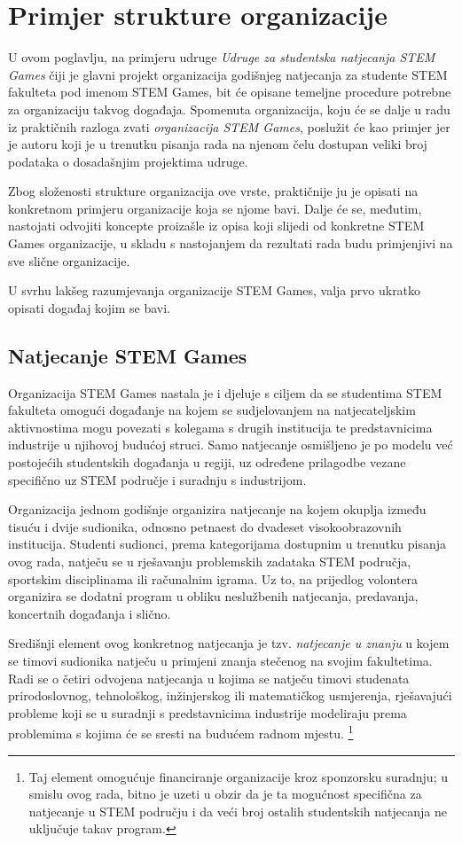\documentclass[times, utf8, diplomski]{fer}
\begin{document}
\chapter{Primjer strukture organizacije}

U ovom poglavlju, na primjeru udruge \emph{Udruge za studentska natjecanja STEM
Games} čiji je glavni projekt organizacija godišnjeg natjecanja za studente STEM
fakulteta pod imenom STEM Games, bit će opisane temeljne procedure potrebne za
organizaciju takvog događaja. Spomenuta organizacija, koju će se dalje u radu iz
praktičnih razloga zvati \emph{organizacija STEM Games}, poslužit će kao primjer
jer je autoru koji je u trenutku pisanja rada na njenom čelu dostupan veliki
broj podataka o dosadašnjim projektima udruge.

Zbog složenosti strukture organizacija ove vrste, praktičnije ju je opisati na
konkretnom primjeru organizacije koja se njome bavi. Dalje će se, međutim,
nastojati odvojiti koncepte proizašle iz opisa koji slijedi od konkretne STEM
Games organizacije, u skladu s nastojanjem da rezultati rada budu primjenjivi na
sve slične organizacije.

U svrhu lakšeg razumjevanja organizacije STEM Games, valja prvo ukratko opisati
događaj kojim se bavi.

\section{Natjecanje STEM Games}

Organizacija STEM Games nastala je i djeluje s ciljem da se studentima STEM
fakulteta omogući događanje na kojem se sudjelovanjem na natjecateljskim
aktivnostima mogu povezati s kolegama s drugih institucija te predstavnicima
industrije u njihovoj budućoj struci. Samo natjecanje osmišljeno je po modelu
već postojećih studentskih događanja u regiji, uz određene prilagodbe vezane
specifično uz STEM područje i suradnju s industrijom.

Organizacija jednom godišnje organizira natjecanje na kojem okuplja između
tisuću i dvije sudionika, odnosno petnaest do dvadeset visokoobrazovnih
institucija.  Studenti sudionci, prema kategorijama dostupnim u trenutku pisanja
ovog rada, natječu se u rješavanju problemskih zadataka STEM područja, sportskim
disciplinama ili računalnim igrama. Uz to, na prijedlog volontera organizira se
dodatni program u obliku neslužbenih natjecanja, predavanja, koncertnih
događanja i slično.

Središnji element ovog konkretnog natjecanja je tzv. \emph{natjecanje u znanju}
u kojem se timovi sudionika natječu u primjeni znanja stečenog na svojim
fakultetima. Radi se o četiri odvojena natjecanja u kojima se natječu timovi
studenata prirodoslovnog, tehnološkog, inžinjerskog ili matematičkog usmjerenja,
rješavajući probleme koji se u suradnji s predstavnicima industrije modeliraju
prema problemima s kojima će se sresti na budućem radnom mjestu.  \footnote{Taj
    element omogućuje financiranje organizacije kroz sponzorsku suradnju; u
    smislu ovog rada, bitno je uzeti u obzir da je ta mogućnost specifična za
    natjecanje u STEM području i da veći broj ostalih studentskih natjecanja ne
uključuje takav program.}
\end{document}
